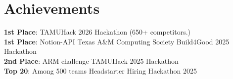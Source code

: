 \documentclass[letterpaper,10pt]{article}
\begin{document}
%

%


\section{Achievements}
\begin{itemize}[leftmargin=0.15in, label={}]
   \small{\item{
    \textbf{1st Place}{: TAMUHack 2026 Hackathon (650+ competitors.)} \\
    \textbf{1st Place}{: Notion-API Texas A\&M Computing Society Build4Good 2025 Hackathon} \\
    \textbf{2nd Place}{: ARM challenge TAMUHack 2025 Hackathon} \\
    \textbf{Top 20}{: Among 500 teams Headstarter Hiring Hackathon 2025} \\
   }}
 \end{itemize}
\end{document}
